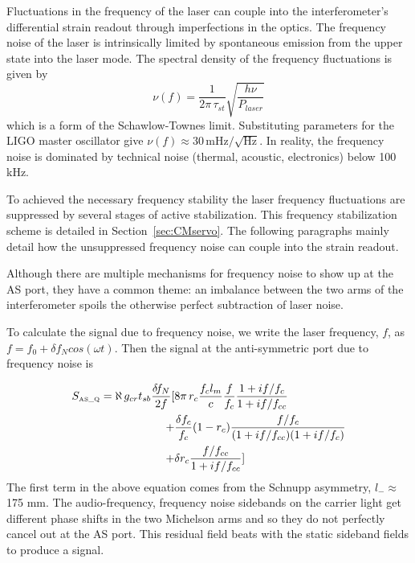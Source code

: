 Fluctuations in the frequency of the laser can couple into
the interferometer's differential strain readout through imperfections in
the optics. The frequency noise of the laser is intrinsically limited by
spontaneous emission from the upper state into the laser mode. The spectral
density of the frequency fluctuations is given by
\begin{equation}
\nu(f) = \frac{1}{2 \pi \, \tau_{st}} \sqrt{\frac{h\nu}{P_{laser}}} 
\end{equation}
which is a form of the Schawlow-Townes limit\cite{Yariv,Peter:YAG}.
Substituting parameters for the LIGO master oscillator give 
$\nu(f) \approx 30 \, \mbox{mHz}/\sqrt{\mbox{Hz}}$. In reality, the frequency noise
is dominated by technical noise (thermal, acoustic, electronics) below 100 kHz.

To achieved the necessary frequency stability the laser frequency fluctuations are 
suppressed by several stages
of active stabilization. This frequency stabilization scheme is detailed in
Section~\ref{sec:CMservo}. The following paragraphs mainly detail how the
unsuppressed frequency noise can couple into the strain readout.

Although there are multiple mechanisms for frequency noise to show up 
at the AS port, they have a common theme: an imbalance between the 
two arms of the interferometer spoils the otherwise perfect 
subtraction of laser noise.

To calculate the signal due to frequency noise, we write the 
laser frequency, $f$, as $f = f_{0} + \delta\! f_N cos(\omega t)$. 
Then the signal at the anti-symmetric port due to frequency noise is

\begin{equation}
 \begin{split}
S_{\mbox{\tiny AS\_Q}} = 
\aleph \, g_{cr} t_{sb} \frac{\delta\! f_N}{2 f} [
& 8 \pi \, r_{c} \frac{f_{c}l_{m}}{c} \frac{f}{f_{c}}
\frac{1 + i f / f_{c}}{1 + i f / f_{cc}} \\
+ &\frac{\delta f_{c}}{f_{c}} (1-r_{c}) 
\frac{f / f_{c}}{(1 + i f / f_{cc})(1 + i f / f_{c})} \\
+ &\delta r_{c} \frac{f / f_{cc}}{1+if /f_{cc}} ]
 \end{split}
\end{equation}
The first term in the above equation comes from the Schnupp asymmetry, 
$l_{-} \approx$ 175 mm. The audio-frequency, frequency noise sidebands on the
carrier light get different phase shifts in the two Michelson arms and so they 
do not perfectly cancel out at the AS port. This residual field beats with the
static sideband fields to produce a signal.

